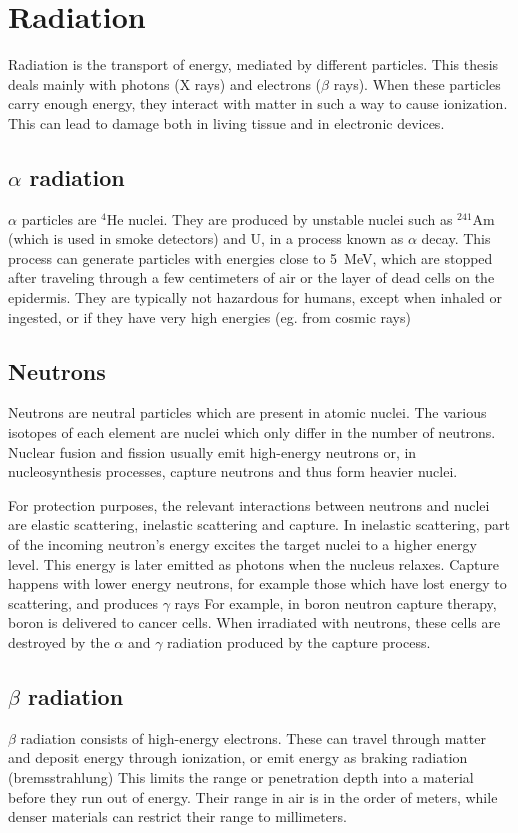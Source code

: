 \section{Radiation}
\label{sec:radiacion}
Radiation is the transport of energy, mediated by different particles.
This thesis deals mainly with photons (X rays) and electrons ($\beta$ rays).
When these particles carry enough energy,
they interact with matter in such a way to cause ionization.
This can lead to damage both in living tissue and in electronic devices.
%
\subsection{$\alpha$ radiation}
$\alpha$ particles are $^4$He nuclei.
They are produced by unstable nuclei such as
$^{241}$Am (which is used in smoke detectors) and U,
in a process known as $\alpha$ decay.
This process can generate particles with energies close to
\SI{5}{\mega\electronvolt},
which are stopped after traveling through a few centimeters of air
or the layer of dead cells on the epidermis.
They are typically not hazardous for humans,
except when inhaled or ingested,
or if they have very high energies (eg. from cosmic rays)
\subsection{Neutrons}
Neutrons are neutral particles which are present in atomic nuclei.
The various isotopes of each element are nuclei which only differ in the number of neutrons.
Nuclear fusion and fission usually emit high-energy neutrons or,
in nucleosynthesis processes,
capture neutrons and thus form heavier nuclei.

For protection purposes, the relevant interactions between neutrons and nuclei
are elastic scattering, inelastic scattering and capture.
In inelastic scattering,
part of the incoming neutron's energy excites the target nuclei to a higher energy level.
This energy is later emitted as photons when the nucleus relaxes.
Capture happens with lower energy neutrons,
for example those which have lost energy to scattering,
and produces $\gamma$ rays
For example, in boron neutron capture therapy,
boron is delivered to cancer cells.
When irradiated with neutrons, these cells are destroyed
by the $\alpha$ and $\gamma$ radiation produced by the capture process.
\subsection{$\beta$ radiation}
$\beta$ radiation consists of high-energy electrons.
These can travel through matter and deposit energy through ionization,
or emit energy as braking radiation (bremsstrahlung)
This limits the range or penetration depth into a material before they run out of energy.
Their range in air is in the order of meters,
while denser materials can restrict their range to millimeters.

